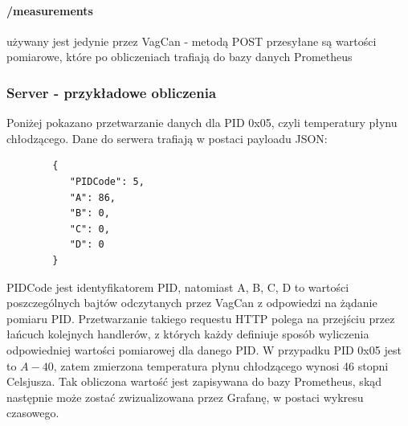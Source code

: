 \documentclass[10pt,a4paper]{article}
\begin{document}
		\paragraph{\slash measurements} używany jest jedynie przez VagCan - metodą POST przesyłane są wartości pomiarowe, które po obliczeniach trafiają do bazy danych Prometheus
		\subsubsection{Server - przykładowe obliczenia}
		Poniżej pokazano przetwarzanie danych dla PID 0x05, czyli temperatury płynu chłodzącego.
		Dane do serwera trafiają w postaci payloadu JSON:\\
		\begin{lstlisting}
		{
		   "PIDCode": 5,
		   "A": 86,
		   "B": 0,
		   "C": 0,
		   "D": 0
		}
		\end{lstlisting}
		PIDCode jest identyfikatorem PID, natomiast A, B, C, D to wartości poszczególnych bajtów odczytanych przez VagCan z odpowiedzi na żądanie pomiaru PID. Przetwarzanie takiego requestu HTTP polega na przejściu przez łańcuch kolejnych handlerów, z których każdy definiuje sposób wyliczenia odpowiedniej wartości pomiarowej dla danego PID. W przypadku PID 0x05 jest to
		$ A-40 $, zatem zmierzona temperatura płynu chłodzącego wynosi 46 stopni Celsjusza. Tak obliczona wartość jest zapisywana do bazy Prometheus, skąd następnie może zostać zwizualizowana przez Grafanę, w postaci wykresu czasowego.
\end{document}
